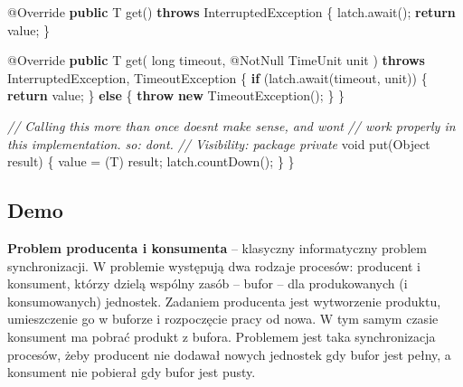 \documentclass[11pt]{article}
\newenvironment{Shaded}{}{}
\newcommand{\KeywordTok}[1]{\textcolor[rgb]{0.00,0.44,0.13}{\textbf{{#1}}}}
\newcommand{\DataTypeTok}[1]{\textcolor[rgb]{0.56,0.13,0.00}{{#1}}}
\newcommand{\CommentTok}[1]{\textcolor[rgb]{0.38,0.63,0.69}{\textit{{#1}}}}
\newcommand{\FunctionTok}[1]{\textcolor[rgb]{0.02,0.16,0.49}{{#1}}}
\newcommand{\NormalTok}[1]{{#1}}
\newcommand{\ControlFlowTok}[1]{\textcolor[rgb]{0.00,0.44,0.13}{\textbf{{#1}}}}
\newcommand{\OperatorTok}[1]{\textcolor[rgb]{0.40,0.40,0.40}{{#1}}}
\newcommand{\BuiltInTok}[1]{{#1}}
\newcommand{\AttributeTok}[1]{\textcolor[rgb]{0.49,0.56,0.16}{{#1}}}
\begin{document}
\begin{Shaded}
\begin{Highlighting}[]
    \AttributeTok{@Override}
    \KeywordTok{public}\NormalTok{ T }\FunctionTok{get}\OperatorTok{()} \KeywordTok{throws} \BuiltInTok{InterruptedException} \OperatorTok{\{}
\NormalTok{        latch}\OperatorTok{.}\FunctionTok{await}\OperatorTok{();}
        \ControlFlowTok{return}\NormalTok{ value}\OperatorTok{;}
    \OperatorTok{\}}

    \AttributeTok{@Override}
    \KeywordTok{public}\NormalTok{ T }\FunctionTok{get}\OperatorTok{(}
        \DataTypeTok{long}\NormalTok{ timeout}\OperatorTok{,}
        \AttributeTok{@NotNull} \BuiltInTok{TimeUnit}\NormalTok{ unit}
    \OperatorTok{)} \KeywordTok{throws} \BuiltInTok{InterruptedException}\OperatorTok{,} \BuiltInTok{TimeoutException} \OperatorTok{\{}
        \ControlFlowTok{if} \OperatorTok{(}\NormalTok{latch}\OperatorTok{.}\FunctionTok{await}\OperatorTok{(}\NormalTok{timeout}\OperatorTok{,}\NormalTok{ unit}\OperatorTok{))} \OperatorTok{\{}
            \ControlFlowTok{return}\NormalTok{ value}\OperatorTok{;}
        \OperatorTok{\}} \ControlFlowTok{else} \OperatorTok{\{}
            \ControlFlowTok{throw} \KeywordTok{new} \BuiltInTok{TimeoutException}\OperatorTok{();}
        \OperatorTok{\}}
    \OperatorTok{\}}

    \CommentTok{// Calling this more than once doesn\textquotesingle{}t make sense, and won\textquotesingle{}t}
    \CommentTok{// work properly in this implementation. so: don\textquotesingle{}t.}
    \CommentTok{// Visibility: package private}
    \DataTypeTok{void} \FunctionTok{put}\OperatorTok{(}\BuiltInTok{Object}\NormalTok{ result}\OperatorTok{)} \OperatorTok{\{}
\NormalTok{        value }\OperatorTok{=} \OperatorTok{(}\NormalTok{T}\OperatorTok{)}\NormalTok{ result}\OperatorTok{;}
\NormalTok{        latch}\OperatorTok{.}\FunctionTok{countDown}\OperatorTok{();}
    \OperatorTok{\}}
\OperatorTok{\}}
\end{Highlighting}
\end{Shaded}

    \hypertarget{demo}{%
\subsection{Demo}\label{demo}}

\textbf{Problem producenta i konsumenta} -- klasyczny informatyczny
problem synchronizacji. W problemie występują dwa rodzaje procesów:
producent i konsument, którzy dzielą wspólny zasób -- bufor -- dla
produkowanych (i konsumowanych) jednostek. Zadaniem producenta jest
wytworzenie produktu, umieszczenie go w buforze i rozpoczęcie pracy od
nowa. W tym samym czasie konsument ma pobrać produkt z bufora. Problemem
jest taka synchronizacja procesów, żeby producent nie dodawał nowych
jednostek gdy bufor jest pełny, a konsument nie pobierał gdy bufor jest
pusty.
\end{document}
